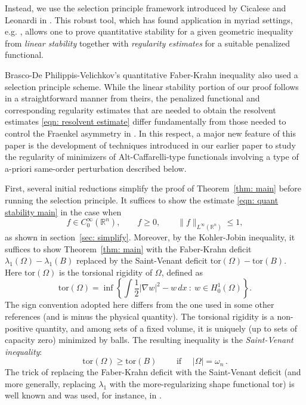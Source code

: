 \documentclass[10pt,a4paper]{amsart}
\numberwithin{equation}{section}
\def\R{{\mathbb R}}
\def\W{\Omega}
\def\grad{\nabla}
\def\tor{\mathrm{tor}}
\begin{document}
Instead, we use the selection principle framework introduced by Cicalese and Leonardi in \cite{CiLe12}. This robust tool, which has found application in myriad settings, e.g. \cite{FuJu, BDF, BDS15, N16, DPMMCapacity, Mukoseeva+2021, FuscoZhang}, allows one to prove quantitative stability for a given geometric inequality from {\it linear stability} together with {\it regularity estimates} for a suitable penalized functional. 


Brasco-De Philippis-Velichkov's quantitative Faber-Krahn inequality \cite{BDV15} also used a selection principle scheme. While the linear stability portion of our proof follows in a straightforward manner from theirs, the penalized functional and corresponding regularity estimates that are needed to obtain the resolvent estimates \eqref{eqn: resolvent estimate}  differ fundamentally  from those needed to control the Fraenkel asymmetry in \cite{BDV15}. 
In this respect, a major new feature of this paper is the development of techniques introduced in our earlier paper \cite{AKN2} to study the regularity of minimizers of Alt-Caffarelli-type functionals involving a type of a-priori same-order perturbation described below.

First, several initial reductions simplify the proof of Theorem~\ref{thm: main} before running the selection principle. It suffices to show the estimate \eqref{eqn: quant stability main} in the case when
 \begin{equation}\label{eqn: f hyp after reductions}
     f \in C_0^\infty(\R^n), \qquad f\geq 0 , \qquad \|f\|_{L^{\infty}(\R^n)}\leq 1,
 \end{equation}
 as shown in section~\ref{sec: simplify}. Moreover, by the Kohler-Jobin inequality, it suffices to show Theorem~\ref{thm: main} with  the Faber-Krahn deficit $\lambda_1(\W) -\lambda_1(B)$ replaced by the Saint-Venant deficit $\tor(\W)-\tor(B)$. Here $\tor(\W)$ is
the torsional rigidity of $\W$,  defined as
	\begin{equation}\label{e: torsion def}
 \tor(\W) =\inf  \left\{ \int \frac{1}{2} |\grad w|^2 - w \, dx \ : \ w \in H^1_0(\W)\right\}.
	\end{equation}
The sign convention adopted here differs from the one used in some other references (and is minus the physical quantity). The torsional rigidity is  a non-positive quantity, and among sets of a fixed volume, it is uniquely (up to sets of capacity zero) minimized by balls. The resulting inequality is the {\it  Saint-Venant inequality}:
	\begin{equation}\label{e: saint venant}
    \tor(\W)\geq \tor(B) \qquad \text{ if } \quad|\W| = \omega_n\,.
    \end{equation}
The trick of replacing the Faber-Krahn deficit with the Saint-Venant deficit (and more generally, replacing $\lambda_1$ with the more-regularizing shape functional $\tor$) is well known and was used, for instance, in \cite{BDV15, blnp23}.
\end{document}
